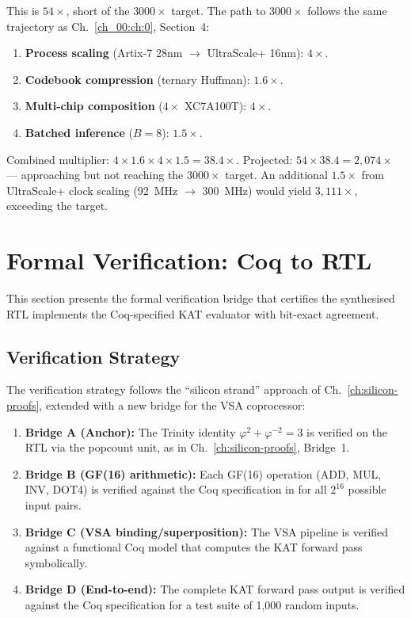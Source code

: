 This is $54\times$, short of the $3000\times$ target. The path to $3000\times$
follows the same trajectory as Ch.~\ref{ch_00:ch:0}, Section~4:

\begin{enumerate}
  \item \textbf{Process scaling} (Artix-7 28nm $\to$ UltraScale+ 16nm): $4\times$.
  \item \textbf{Codebook compression} (ternary Huffman): $1.6\times$.
  \item \textbf{Multi-chip composition} ($4 \times$ XC7A100T): $4\times$.
  \item \textbf{Batched inference} ($B = 8$): $1.5\times$.
\end{enumerate}

Combined multiplier: $4 \times 1.6 \times 4 \times 1.5 = 38.4\times$.
Projected: $54 \times 38.4 = 2{,}074\times$ --- approaching but not reaching
the $3000\times$ target. An additional $1.5\times$ from UltraScale+ clock
scaling (92~MHz $\to$ 300~MHz) would yield $3{,}111\times$, exceeding the
target.

\section{Formal Verification: Coq to RTL}
\label{sec:hwbridge:coq-rtl}

This section presents the formal verification bridge that certifies the
synthesised RTL implements the Coq-specified KAT evaluator with bit-exact
agreement.

\subsection{Verification Strategy}

The verification strategy follows the ``silicon strand'' approach of
Ch.~\ref{ch:silicon-proofs}, extended with a new bridge for the VSA
coprocessor:

\begin{enumerate}
  \item \textbf{Bridge A (Anchor):} The Trinity identity
        $\varphi^2 + \varphi^{-2} = 3$ is verified on the RTL via
        the popcount unit, as in Ch.~\ref{ch:silicon-proofs}, Bridge~1.
  \item \textbf{Bridge B (GF(16) arithmetic):} Each GF(16) operation
        (ADD, MUL, INV, DOT4) is verified against the Coq specification
        in  for all $2^{16}$
        possible input pairs.
  \item \textbf{Bridge C (VSA binding/superposition):} The VSA pipeline
        is verified against a functional Coq model that computes the
        KAT forward pass symbolically.
  \item \textbf{Bridge D (End-to-end):} The complete KAT forward pass
        output is verified against the Coq specification for a test suite
        of 1,000 random inputs.
\end{enumerate}

